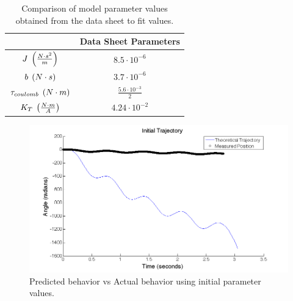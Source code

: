 \documentclass{article}
\theoremstyle{plain}
\theoremstyle{definition}
\theoremstyle{remark}
\begin{document}
\begin{table}[htb]
\begin{center}
    \begin{tabular}{|c|c|}
        \hline
        ~                                                      & Data Sheet Parameters        \\ \hline
        $J \hspace{0.1cm} \left( \frac{N\cdot s^2}{m} \right)$     & $8.5 \cdot 10^{-6} $               \\ 
        $b \hspace{0.1cm} \left( N \cdot s \right) $               & $3.7\cdot 10^{-6} $                 \\ 
        $\tau_{coulomb} \hspace{0.1cm} \left( N \cdot m \right)$           & $\frac{5.6 \cdot 10^{-3}}{2} $  \\ 
        $K_{T} \hspace{0.1cm} \left( \frac{N\cdot m}{A} \right) $ & $4.24 \cdot 10^{-2}$             \\
        \hline
    \end{tabular}
\caption{Comparison of model parameter values obtained from the data sheet to fit values.}
\label{q2_b1}
\end{center}
\end{table}

\begin{figure}[htb]
\begin{center}
\includegraphics[width = 14cm]{initialModel.png}
\caption{Predicted behavior vs Actual behavior using initial parameter values.}
\label{q2_b2}
\end{center}
\end{figure}
\end{document}
